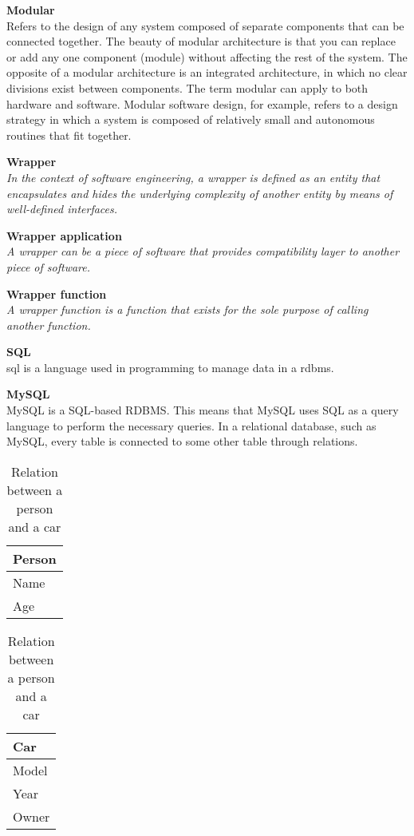 \textbf{Modular} \\
Refers to the design of any system composed of separate components that can be connected together. The beauty of modular architecture is that you can replace or add any one component (module) without affecting the rest of the system. The opposite of a modular architecture is an integrated architecture, in which no clear divisions exist between components. The term modular can apply to both hardware and software. Modular software design, for example, refers to a design strategy in which a system is composed of relatively small and autonomous routines that fit together. 

\textbf{Wrapper} \\
\textit{In the context of software engineering, a wrapper is defined as an entity that encapsulates and hides the underlying complexity of another entity by means of well-defined interfaces.}


\textbf{Wrapper application} \\
\textit{A wrapper can be a piece of software that provides compatibility layer to another piece of software.}

\textbf{Wrapper function} \\
\textit{A wrapper function is a function that exists for the sole purpose of calling another function.}

\textbf{SQL } \\
\acrfull{sql} is a language used in programming to manage data in a \acrfull{rdbms}.

\textbf{MySQL } \\
MySQL is a SQL-based RDBMS. This means that MySQL uses SQL as a query language to perform the necessary queries. In a relational database, such as MySQL, every table is connected to some other table through relations. 


\begin{table}[!htb]
    \caption{Relation between a person and a car}
    \begin{minipage}{.5\linewidth}
      \centering
        \begin{tabular}{|l|}
            \hline
            \textbf{Person} \\ \hline
            Name            \\ \hline
            Age             \\ \hline
        \end{tabular}
    \end{minipage}%
    \begin{minipage}{.5\linewidth}
      \centering
        \begin{tabular}{|l|}
            \hline
            \textbf{Car}    \\ \hline
            Model            \\ \hline
            Year             \\ \hline
            Owner             \\ \hline
        \end{tabular}
    \end{minipage} 
\end{table}

